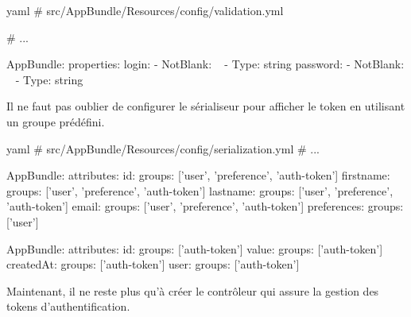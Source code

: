 \documentclass[big]{zmdocument}
\begin{document}
\begin{CodeBlock}{yaml}
# src/AppBundle/Resources/config/validation.yml

# ...

AppBundle\Entity\Credentials:
    properties:
        login:
            - NotBlank: ~
            - Type: string
        password:
            - NotBlank: ~
            - Type: string
\end{CodeBlock}



Il ne faut pas oublier de configurer le sérialiseur pour afficher le token en utilisant un groupe prédéfini.



\begin{CodeBlock}{yaml}
# src/AppBundle/Resources/config/serialization.yml
# ...

AppBundle\Entity\User:
    attributes:
        id:
            groups: ['user', 'preference', 'auth-token']
        firstname:
            groups: ['user', 'preference', 'auth-token']
        lastname:
            groups: ['user', 'preference', 'auth-token']
        email:
            groups: ['user', 'preference', 'auth-token']
        preferences:
            groups: ['user']

AppBundle\Entity\AuthToken:
    attributes:
        id:
            groups: ['auth-token']
        value:
            groups: ['auth-token']
        createdAt:
            groups: ['auth-token']
        user:
            groups: ['auth-token']
\end{CodeBlock}



Maintenant, il ne reste plus qu'à créer le contrôleur qui assure la gestion des tokens d'authentification.
\end{document}
